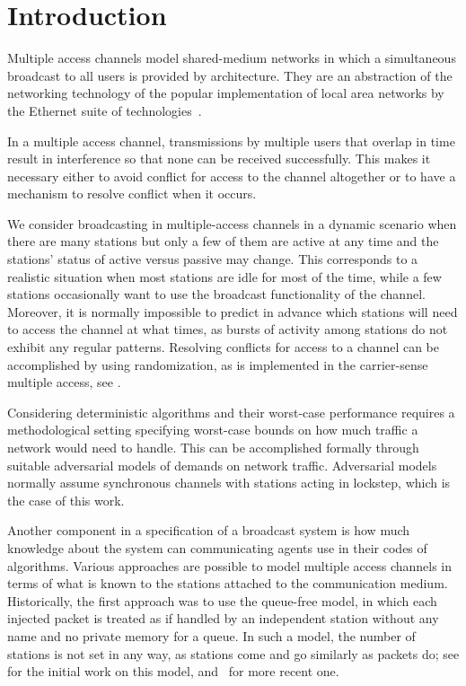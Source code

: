 \documentclass[11pt]{article}
\begin{document}
\newpage



\section{Introduction}

\label{sec:introduction}



Multiple access channels model shared-medium networks in which a simultaneous broadcast to all users is provided by architecture. 
They are an abstraction of the networking technology of the popular implementation of local area networks by the Ethernet suite of technologies~\cite{MetcalfeB-CACM76}.

In a multiple access channel, transmissions by multiple users that overlap in time result in interference so that none can be  received successfully.
This makes it necessary either to avoid  conflict for access to the channel altogether or to have a mechanism to resolve conflict when it occurs.

We consider broadcasting in multiple-access channels in a dynamic scenario when there are many stations but only a few of them are active at any time and the stations' status of active versus passive may change. 
This corresponds to a realistic situation when most stations are idle for most of the time, while a few stations occasionally want to use the broadcast functionality of the channel.
Moreover, it is normally impossible to predict in advance which stations will need to access the channel at what times, as bursts of activity among stations do not exhibit any regular patterns.
Resolving conflicts for access to a channel can be accomplished by using randomization, as is implemented in the carrier-sense multiple access, see \cite{Keshav-book97}.

Considering deterministic algorithms and their worst-case performance requires a  methodological setting specifying worst-case bounds on how much traffic a network would need to handle.
This can be accomplished formally through suitable adversarial models of  demands on network traffic.
Adversarial models normally assume synchronous channels with stations acting in lockstep, which is the case of this work.

Another component in a specification of a broadcast system is how much knowledge about the  system can communicating agents use in their codes of algorithms.
Various approaches are possible to model multiple access channels in terms of what is known to the stations attached to the communication medium.
Historically, the first approach was to use the queue-free model, in which each injected packet is treated as if handled by an independent station without any name and no private memory for a queue.
In such a model, the number of stations is not set in any way, as stations come and go similarly as packets do; see \cite{Gallager-TIT85} for the initial work on this model, and~\cite{BenderFHKL05} for more recent one.
\end{document}
